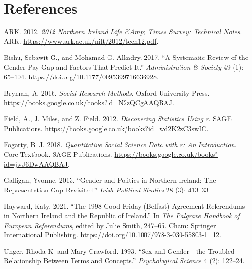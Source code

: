\documentclass[
]{article}
\newlength{\cslhangindent}
\newlength{\cslentryspacingunit} %
\newenvironment{CSLReferences}[2] %
 {%
  \setlength{\parindent}{0pt}
  \ifodd #1
  \let\oldpar\par
  \def\par{\hangindent=\cslhangindent\oldpar}
  \fi
  \setlength{\parskip}{#2\cslentryspacingunit}
 }%
 {}
\begin{document}
\hypertarget{references}{%
\section{References}\label{references}}

\hypertarget{refs}{}
\begin{CSLReferences}{1}{0}
\leavevmode{}%
ARK. 2012. \emph{2012 Northern Ireland Life \&Amp; Times Survey:
Technical Notes}. ARK. \url{https://www.ark.ac.uk/nilt/2012/tech12.pdf}.

\leavevmode{}%
Bishu, Sebawit G., and Mohamad G. Alkadry. 2017. {``A Systematic Review
of the Gender Pay Gap and Factors That Predict It.''}
\emph{Administration \& Society} 49 (1): 65--104.
\url{https://doi.org/10.1177/0095399716636928}.

\leavevmode{}%
Bryman, A. 2016. \emph{Social Research Methods}. Oxford University
Press. \url{https://books.google.co.uk/books?id=N2zQCgAAQBAJ}.

\leavevmode{}%
Field, A., J. Miles, and Z. Field. 2012. \emph{Discovering Statistics
Using r}. SAGE Publications.
\url{https://books.google.co.uk/books?id=wd2K2zC3swIC}.

\leavevmode{}%
Fogarty, B. J. 2018. \emph{Quantitative Social Science Data with r: An
Introduction}. Core Textbook. SAGE Publications.
\url{https://books.google.co.uk/books?id=jwJ6DwAAQBAJ}.

\leavevmode{}%
Galligan, Yvonne. 2013. {``Gender and Politics in Northern Ireland: The
Representation Gap Revisited.''} \emph{Irish Political Studies} 28 (3):
413--33.

\leavevmode{}%
Hayward, Katy. 2021. {``The 1998 Good Friday (Belfast) Agreement
Referendums in Northern Ireland and the Republic of Ireland.''} In
\emph{The Palgrave Handbook of European Referendums}, edited by Julie
Smith, 247--65. Cham: Springer International Publishing.
\url{https://doi.org/10.1007/978-3-030-55803-1_12}.

\leavevmode{}%
Unger, Rhoda K, and Mary Crawford. 1993. {``Sex and Gender---the
Troubled Relationship Between Terms and Concepts.''} \emph{Psychological
Science} 4 (2): 122--24.

\end{CSLReferences}
\end{document}
